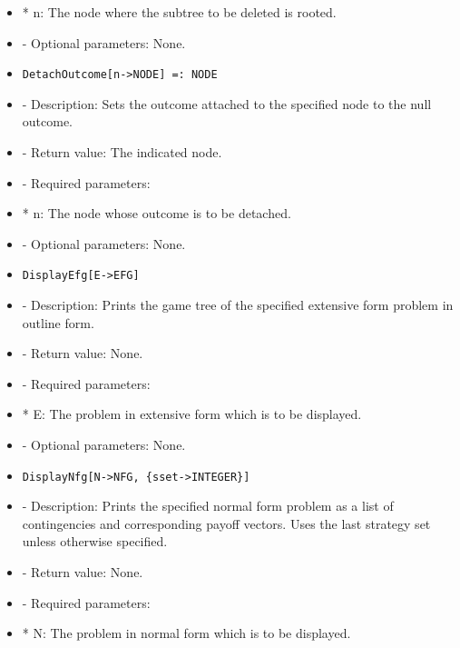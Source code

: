 \begin{itemize}
\bd
\item  
*  n:  The node where the subtree to be deleted is rooted.
\ed

\item
- Optional parameters:  None.
\ed

\item
\begin{verbatim}
DetachOutcome[n->NODE] =: NODE
\end{verbatim}

\bd
\item
- Description:  Sets the outcome attached to the specified node to the 
null outcome.
\item   
- Return value:  The indicated node.
\item
- Required parameters:

\bd
\item	
*  n:  The node whose outcome is to be detached.
\ed

\item
- Optional parameters:  None.
\ed

\item
\begin{verbatim}
DisplayEfg[E->EFG]
\end{verbatim}

\bd
\item
- Description:  Prints the game tree of the specified extensive form
problem in outline form.
\item
- Return value:  None.
\item
- Required parameters:

\bd
\item
*  E:  The problem in extensive form which is to be displayed.
\ed

\item
- Optional parameters:  None.
\ed

\item
\begin{verbatim}
DisplayNfg[N->NFG, {sset->INTEGER}]
\end{verbatim}

\bd
\item
- Description:  Prints the specified normal form problem as a list of
contingencies and corresponding payoff vectors.  Uses the last
strategy set unless otherwise specified.
\item
- Return value:  None.
\item
- Required parameters:

\bd	
\item
*  N:  The problem in normal form which is to be displayed.
\ed


\end{itemize}
